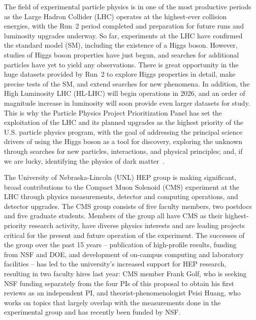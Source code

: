\noindent
The field of experimental particle physics is in one of the most productive periods as the Large Hadron Collider (LHC) operates at the highest-ever collision energies, with the Run~2 period completed and preparation for future runs and  luminosity upgrades underway.
%
So far, experiments at the LHC have confirmed the standard model (SM), including the existence of a Higgs boson.  However, studies of Higgs boson properties have just begun, and searches for additional particles have yet to yield any observations. There is great opportunity in the huge datasets provided by Run~2 to explore Higgs properties in detail, make precise tests of the SM, and extend searches for new phenomena.  In addition, the High Luminosity LHC (HL-LHC) will begin operations in 2026, and an order of magnitude increase in luminosity will soon provide even larger datasets for study.  This is why the Particle Physics Project Prioritization Panel has set the exploitation of the LHC and its planned upgrades as the highest priority of the U.S. particle physics program, with the goal of addressing the principal science drivers of using the Higgs boson as a tool for discovery, exploring the unknown through searches for new particles, interactions, and physical principles; and, if we are lucky, identifying the physics of dark matter~\cite{bib:P5}.

The University of Nebraska-Lincoln (UNL) HEP group is making significant, broad contributions to the Compact Muon Solenoid (CMS) experiment at the LHC through physics measurements, detector and computing operations, and detector upgrades. The CMS group consists of five faculty members, two postdocs and five graduate students. Members of the group all have CMS as their highest-priority research activity, have diverse physics interests and are leading projects critical for the present and future operation of the experiment.  The successes of the group over the past 15 years -- publication of high-profile results, funding from NSF and DOE, and development of on-campus computing and laboratory facilities -- has led to the university's increased support for HEP research, resulting in two faculty hires last year: CMS member Frank Golf, who is seeking NSF funding separately from the four PIs of this proposal to obtain his first reviews as an independent PI, and theorist-phenomenologist Peisi Huang, who works on topics that largely overlap with the measurements done in the experimental group and has recently been funded by NSF.


